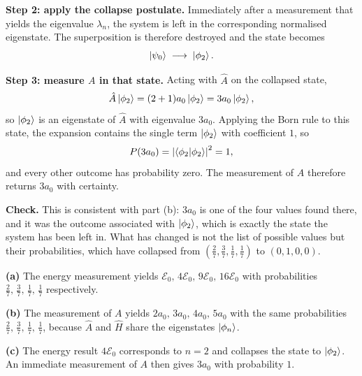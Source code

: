 \documentclass[12pt]{article}
\begin{document}
\begin{solutionbox}
\textbf{Step 2: apply the collapse postulate.} Immediately after a measurement that yields the eigenvalue $\lambda_{n}$, the system is left in the corresponding normalised eigenstate. The superposition is therefore destroyed and the state becomes
\[
    \ket{\psi_{0}}\;\longrightarrow\;\ket{\phi_{2}} .
\]

\textbf{Step 3: measure $A$ in that state.} Acting with $\hat{A}$ on the collapsed state,
\[
    \hat{A}\ket{\phi_{2}}=(2+1)a_{0}\ket{\phi_{2}}=3a_{0}\ket{\phi_{2}} ,
\]
so $\ket{\phi_{2}}$ is an eigenstate of $\hat{A}$ with eigenvalue $3a_{0}$. Applying the Born rule to this state, the expansion contains the single term $\ket{\phi_{2}}$ with coefficient $1$, so
\[
    P(3a_{0})=\left|\braket{\phi_{2}|\phi_{2}}\right|^{2}=1,
\]
and every other outcome has probability zero. The measurement of $A$ therefore returns $3a_{0}$ with certainty.

\textbf{Check.} This is consistent with part (b): $3a_{0}$ is one of the four values found there, and it was the outcome associated with $\ket{\phi_{2}}$, which is exactly the state the system has been left in. What has changed is not the list of possible values but their probabilities, which have collapsed from $\left(\tfrac{2}{7},\tfrac{3}{7},\tfrac{1}{7},\tfrac{1}{7}\right)$ to $(0,1,0,0)$.
\end{solutionbox}

\begin{answerbox}
\textbf{(a)} The energy measurement yields $\mathcal{E}_{0},\,4\mathcal{E}_{0},\,9\mathcal{E}_{0},\,16\mathcal{E}_{0}$ with probabilities $\tfrac{2}{7},\,\tfrac{3}{7},\,\tfrac{1}{7},\,\tfrac{1}{7}$ respectively.

\textbf{(b)} The measurement of $A$ yields $2a_{0},\,3a_{0},\,4a_{0},\,5a_{0}$ with the same probabilities $\tfrac{2}{7},\,\tfrac{3}{7},\,\tfrac{1}{7},\,\tfrac{1}{7}$, because $\hat{A}$ and $\hat{H}$ share the eigenstates $\ket{\phi_{n}}$.

\textbf{(c)} The energy result $4\mathcal{E}_{0}$ corresponds to $n=2$ and collapses the state to $\ket{\phi_{2}}$. An immediate measurement of $A$ then gives $3a_{0}$ with probability $1$.
\end{answerbox}
\end{document}
